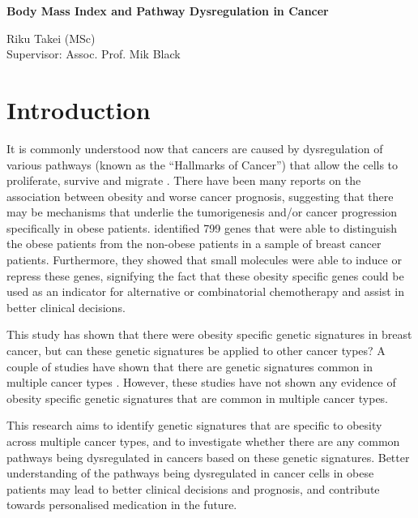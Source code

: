\documentclass[a4paper,12pt]{report}
\begin{document}
\begin{center}
\large{\textbf{Body Mass Index and Pathway Dysregulation in Cancer}}\\

\vspace{0.3cm}

Riku Takei (MSc)\\
Supervisor: Assoc. Prof. Mik Black
\end{center}

\section*{Introduction}

It is commonly understood now that cancers are caused by dysregulation of various pathways (known as the ``Hallmarks of Cancer'') that allow the cells to proliferate, survive and migrate \citep{Hanahan2011}.
There have been many reports on the association between obesity and worse cancer prognosis, suggesting that there may be mechanisms that underlie the tumorigenesis and/or cancer progression specifically in obese patients.
\citet{Creighton2012} identified 799 genes that were able to distinguish the obese patients from the non-obese patients in a sample of breast cancer patients.
Furthermore, they showed that small molecules were able to induce or repress these genes, signifying the fact that these obesity specific genes could be used as an indicator for alternative or combinatorial chemotherapy and assist in better clinical decisions.

This study has shown that there were obesity specific genetic signatures in breast cancer, but can these genetic signatures be applied to other cancer types?
A couple of studies have shown that there are genetic signatures common in multiple cancer types \citep{Alexandrov2013,Lawrence2014}.
However, these studies have not shown any evidence of obesity specific genetic signatures that are common in multiple cancer types.

This research aims to identify genetic signatures that are specific to obesity across multiple cancer types, and to investigate whether there are any common pathways being dysregulated in cancers based on these genetic signatures.
Better understanding of the pathways being dysregulated in cancer cells in obese patients may lead to better clinical decisions and prognosis, and contribute towards personalised medication in the future.
\end{document}

